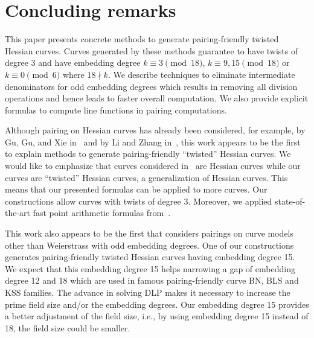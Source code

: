 \section{Concluding remarks}


This paper presents concrete methods to generate pairing-friendly twisted Hessian curves.
Curves generated by these methods guarantee to have twists of degree $3$ and
have embedding degree
$k \equiv 3 \pmod{18}$,
$k \equiv 9,15 \pmod{18}$ or
$k \equiv 0 \pmod{6}$ where $18 \nmid k$.
We describe techniques to eliminate intermediate denominators for odd embedding degrees
which results in removing all division operations and hence leads to faster overall computation.
We also provide explicit formulas to compute line functions in pairing computations.

Although pairing on Hessian curves has already been considered,
for example, by Gu, Gu, and Xie in~\cite{2010/Gu} and by Li and Zhang in~\cite{2012/Li},
this work appears to be the first to explain methods to generate pairing-friendly ``twisted'' Hessian curves.
We would like to emphasize that curves considered in~\cite{2010/Gu} are Hessian curves
while our curves are ``twisted'' Hessian curves, a generalization of Hessian curves.
This means that our presented formulas can be applied to more curves.
Our constructions allow curves with twists of degree $3$.
Moreover, we applied state-of-the-art fast point arithmetic formulas from~\cite{2015/hessian}.

This work also appears to be the first that considers pairings on curve models other than Weierstrass with odd embedding degrees.
One of our constructions generates pairing-friendly twisted Hessian curves having embedding degree 15.
We expect that this embedding degree 15 helps narrowing a gap of embedding degree 12 and 18
which are used in famous pairing-friendly curve BN, BLS and KSS families.
The advance in solving DLP makes it necessary to increase the prime field size and/or the embedding degrees.
Our embedding degree 15 provides a better adjustment of the field size,
i.e., by using embedding degree 15 instead of 18, the field size could be smaller.

